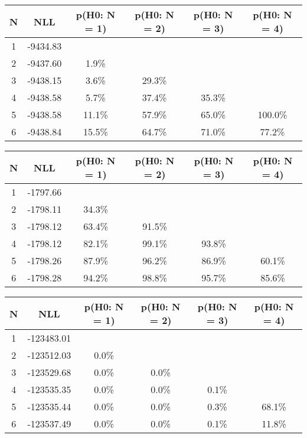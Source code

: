 \begin{table}[htb]
	\begin{center}
{\footnotesize\renewcommand{\arraystretch}{1.4}
		\begin{tabular}{cc||cccc}
			N & NLL & p(H0: N = 1) & p(H0: N = 2) & p(H0: N = 3) & p(H0: N = 4)\\ 
		\hline
1 & -9434.83 & & & & \\
2 & -9437.60 & 1.9\% & & & \\
3 & -9438.15 & 3.6\% & 29.3\% & & \\
4 & -9438.58 & 5.7\% & 37.4\% & 35.3\% & \\
5 & -9438.58 & 11.1\% & 57.9\% & 65.0\% & 100.0\% \\
6 & -9438.84 & 15.5\% & 64.7\% & 71.0\% & 77.2\% \\
	\end{tabular}
		\label{tab:lab}
	}
	\end{center}\end{table}

\begin{table}[htb]
	\begin{center}
{\footnotesize\renewcommand{\arraystretch}{1.4}
		\begin{tabular}{cc||cccc}
			N & NLL & p(H0: N = 1) & p(H0: N = 2) & p(H0: N = 3) & p(H0: N = 4)\\ 
		\hline
1 & -1797.66 & & & & \\
2 & -1798.11 & 34.3\% & & & \\
3 & -1798.12 & 63.4\% & 91.5\% & & \\
4 & -1798.12 & 82.1\% & 99.1\% & 93.8\% & \\
5 & -1798.26 & 87.9\% & 96.2\% & 86.9\% & 60.1\% \\
6 & -1798.28 & 94.2\% & 98.8\% & 95.7\% & 85.6\% \\
	\end{tabular}
		\label{tab:lab}
	}
	\end{center}\end{table}

\begin{table}[htb]
	\begin{center}
{\footnotesize\renewcommand{\arraystretch}{1.4}
		\begin{tabular}{cc||cccc}
			N & NLL & p(H0: N = 1) & p(H0: N = 2) & p(H0: N = 3) & p(H0: N = 4)\\ 
		\hline
1 & -123483.01 & & & & \\
2 & -123512.03 & 0.0\% & & & \\
3 & -123529.68 & 0.0\% & 0.0\% & & \\
4 & -123535.35 & 0.0\% & 0.0\% & 0.1\% & \\
5 & -123535.44 & 0.0\% & 0.0\% & 0.3\% & 68.1\% \\
6 & -123537.49 & 0.0\% & 0.0\% & 0.1\% & 11.8\% \\
	\end{tabular}
		\label{tab:lab}
	}
	\end{center}\end{table}

